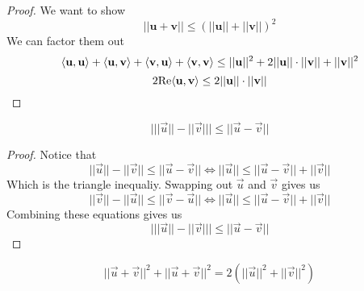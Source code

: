 \begin{proof}
We want to show
\[ ||\mathbf u + \mathbf v|| \leq \left( || \mathbf u || + ||\mathbf v||\right)^2\]
We can factor them out 
\[ \langle \mathbf u, \mathbf u \rangle + \langle \mathbf u, \mathbf v \rangle + \langle \mathbf v, \mathbf u \rangle + \langle \mathbf v, \mathbf v \rangle \leq ||\mathbf u||^2 + 2 ||\mathbf u|| \cdot ||\mathbf v|| + ||\mathbf v||^2\]
\[ 2\textrm{Re} \langle \mathbf u, \mathbf v \rangle \leq 2||\mathbf u||\cdot ||\mathbf v|| \]
\end{proof}
\begin{theorem}
    \[ \big| ||\vec u|| - ||\vec v|| \big| \leq ||\vec u - \vec v||\]
\end{theorem}
\begin{proof}
    Notice that 
    \[   ||\vec u|| - ||\vec v|| \leq ||\vec u - \vec v|| \iff ||\vec u|| \leq ||\vec u - \vec v||  + ||\vec v||\]
    Which is the triangle inequaliy. Swapping out $\vec u$ and $\vec v$ gives us \[   ||\vec v|| - ||\vec u|| \leq ||\vec v - \vec u|| \iff ||\vec u|| \leq ||\vec u - \vec v||  + ||\vec v||\]
    Combining these equations gives us
    \[ \big| ||\vec u|| - ||\vec v|| \big| \leq ||\vec u - \vec v||\]
\end{proof}
\begin{fact}
\[ ||\vec u + \vec v||^2 + ||\vec u + \vec v||^2 = 2\left(||\vec u||^2 + ||\vec v||^2\right)\]
\end{fact}

